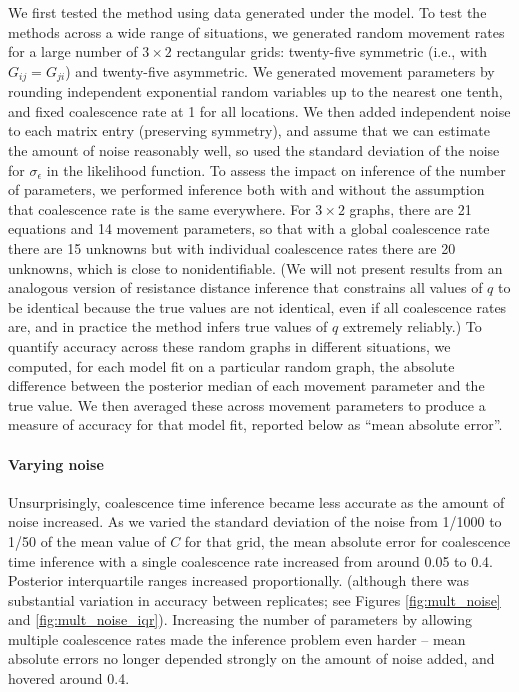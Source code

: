 \documentclass{article}
\begin{document}
We first tested the method using data generated under the model.
To test the methods across a wide range of situations,
we generated random movement rates for 
a large number of $3 \times 2$ rectangular grids:
twenty-five symmetric (i.e., with $G_{ij} = G_{ji}$) and twenty-five asymmetric.
We generated movement parameters
by rounding independent exponential random variables up to the nearest one tenth,
and fixed coalescence rate at 1 for all locations.
We then added independent noise to each matrix entry (preserving symmetry),
and assume that we can estimate the amount of noise reasonably well, 
so used the standard deviation of the noise for $\sigma_\epsilon$ in the likelihood function.
To assess the impact on inference of the number of parameters,
we performed inference both with and without the assumption 
that coalescence rate is the same everywhere.
For $3 \times 2$ graphs, there are 21 equations
and 14 movement parameters,
so that with a global coalescence rate there are 15 unknowns
but with individual coalescence rates there are 20 unknowns,
which is close to nonidentifiable.
(We will not present results from an analogous version of resistance distance inference
that constrains all values of $q$ to be identical
because the true values are not identical, even if all coalescence rates are,
and in practice the method infers true values of $q$ extremely reliably.)
To quantify accuracy across these random graphs in different situations,
we computed, for each model fit on a particular random graph,
the absolute difference between the posterior median of each movement parameter
and the true value.
We then averaged these across movement parameters to produce a measure of accuracy for that model fit,
reported below as ``mean absolute error''.


\paragraph{Varying noise}
Unsurprisingly, coalescence time inference became less accurate as the amount of noise increased.
As we varied the standard deviation of the noise
from 1/1000 to 1/50 of the mean value of $C$ for that grid,
the mean absolute error 
for coalescence time inference with a single coalescence rate
increased from around 0.05 to 0.4.
Posterior interquartile ranges increased proportionally.
(although there was substantial variation in accuracy between replicates;
see Figures \ref{fig:mult_noise} and \ref{fig:mult_noise_iqr}).
Increasing the number of parameters by allowing multiple coalescence rates
made the inference problem even harder --
mean absolute errors no longer depended strongly on the amount of noise added,
and hovered around 0.4.
\end{document}
